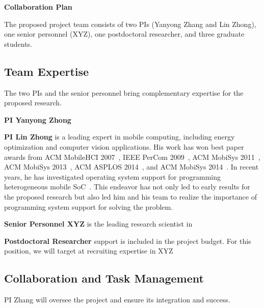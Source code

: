 \begin{center}
{\large {\bf Collaboration Plan}} \\
\end{center}
The proposed project team consists of two PIs (Yanyong Zhang and Lin Zhong), one senior personnel (XYZ), one postdoctoral researcher, and three graduate students. 

\subsection*{Team Expertise}
The two PIs and the senior personnel bring complementary expertise for the proposed research.

{\bf PI Yanyong Zhong}  


{\bf PI Lin Zhong} is a leading expert in mobile computing, including energy optimization and computer vision applications. His work has won best paper awards from ACM MobileHCI 2007~\cite{rahmati2007mobilehci}, IEEE PerCom 2009~\cite{liu2009percom}, ACM MobiSys 2011~\cite{dong2011mobisysa}, ACM MobiSys 2013~\cite{likamwa2013mobisysa}, ACM ASPLOS 2014~\cite{lin2014asplos}, and ACM MobiSys 2014~\cite{amirisani2014mobisys}.  In recent years, he has investigated operating system support for programming heterogeneous mobile SoC~\cite{lin2012asplos,lin2012hotpower,lin2014asplos}. This endeavor has not only led to early results for the proposed research but also led him and his team to realize the importance of programming system support for solving the problem. 

{\bf Senior Personnel XYZ} is the leading research scientist in 

{\bf Postdoctoral Researcher} support is included in the project budget. For this position, we will target at recruiting expertise in XYZ

\subsection*{Collaboration and Task Management}

PI Zhang will oversee the project and ensure its integration and success. 

